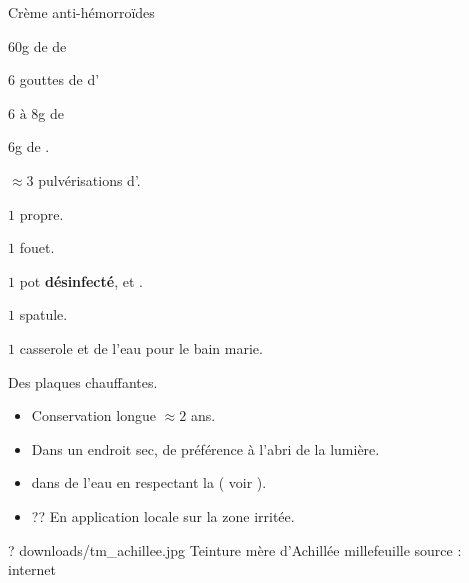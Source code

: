 \label{hemorroides}
\ficherecette
{%
    Crème anti-hémorroïdes
}
{%
    \item $60$g de  de 
    \item $6$ gouttes de  d'
    \item $6 \text{ à }8$g de 
    \item $6$g de .
    \item $\approx 3$ pulvérisations d'.
}
{%
    \item $1$  propre. 
    \item $1$ fouet. 
    \item $1$ pot \textbf{désinfecté},  et .
    \item $1$ spatule. 
    \item $1$ casserole et de l'eau pour le bain marie. 
    \item Des plaques chauffantes. 
}
{%
    \begin{itemize}[label=\faPen]
        \item Conservation longue $\approx 2$ ans.
        \item Dans un endroit sec, de préférence à l'abri de la lumière. 
    \end{itemize}
}
{%
    \begin{itemize}[label=\faPen]
        \item {} dans de l'eau en respectant la  ( voir  ).
        \item ?? En application locale sur la zone irritée.
    \end{itemize}
}
{%
    ?
}
{%
    downloads/tm_achillee.jpg
}
{%
   Teinture mère d'Achillée millefeuille
}
{%
    source : internet
}